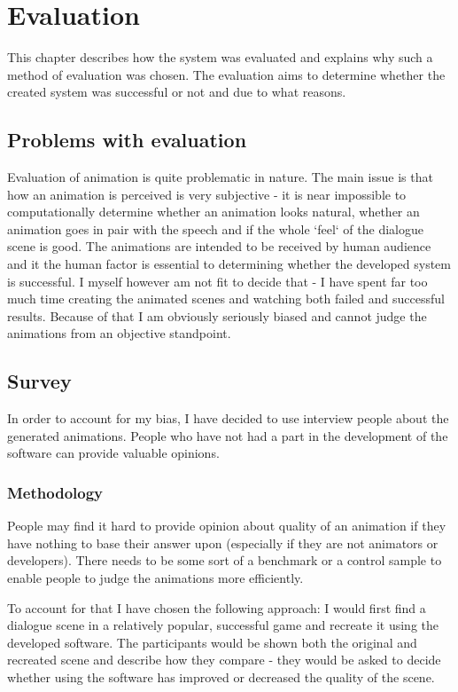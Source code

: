 \chapter{Evaluation \label{chap:eval}}
This chapter describes how the system was evaluated and explains why such a method of evaluation was chosen. The evaluation aims to determine whether the created system was successful or not and due to what reasons. 

\section{Problems with evaluation}
Evaluation of animation is quite problematic in nature. The main issue is that how an animation is perceived is very subjective - it is near impossible to computationally determine whether an animation looks natural, whether an animation goes in pair with the speech and if the whole `feel` of the dialogue scene is good. The animations are intended to be received by human audience and it the human factor is essential to determining whether the developed system is successful. I myself however am not fit to decide that - I have spent far too much time creating the animated scenes and watching both failed and successful results. Because of that I am obviously seriously biased and cannot judge the animations from an objective standpoint.


\section{Survey}
In order to account for my bias, I have decided to use interview people about the generated animations. People who have not had a part in the development of the software can provide valuable opinions.


\subsection{Methodology}
People may find it hard to provide opinion about quality of an animation if they have nothing to base their answer upon (especially if they are not animators or developers). There needs to be some sort of a benchmark or a control sample to enable people to judge the animations more efficiently.

To account for that I have chosen the following approach: I would first find a dialogue scene in a relatively popular, successful game and recreate it using the developed software. The participants would be shown both the original and recreated scene and describe how they compare - they would be asked to decide whether using the software has improved or decreased the quality of the scene. 

